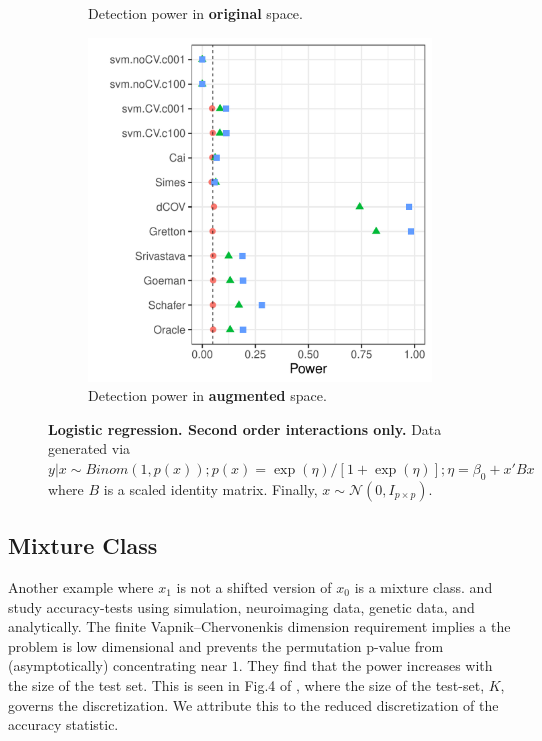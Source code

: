 \documentclass[oupdraft]{bio}
\begin{document}
\begin{figure}[th]
\begin{subfigure}[t]{.3\columnwidth}
	\caption{Detection power in \textbf{original} space.} 
	\label{fig:logistic-interactions-only-original}
	\end{subfigure}
	\begin{subfigure}[t]{.3\columnwidth}
	\centering
	\includegraphics[width=1\columnwidth]{"file43"}
	\caption{Detection power in \textbf{augmented} space.} 
	\label{fig:logistic-interactions-only-augmented}
	\end{subfigure}
	\caption{\textbf{Logistic regression. Second order interactions only.}
		Data generated via $y|x \sim Binom(1,p(x));
		p(x)=\exp(\eta)/[1+\exp(\eta)];
		\eta=\beta_0+x'Bx$ 
		where $B$ is a scaled identity matrix.
		Finally, $x\sim \mathcal{N}(0,I_{p\times p})$.	
	}
	\label{fig:logistic-interactions-only}
\end{figure}







\subsection{Mixture Class}

Another example where $x_1$ is not a shifted version of $x_0$ is a mixture class. 
\cite{golland_permutation_2003} and \cite{golland_permutation_2005} study accuracy-tests using simulation, neuroimaging data, genetic data, and analytically.
The finite Vapnik–Chervonenkis dimension requirement \cite[Sec 4.3]{golland_permutation_2005} implies a the problem is low dimensional and prevents the permutation p-value from (asymptotically) concentrating near $1$. 
They find that the power increases with the size of the test set.
This is seen in Fig.4 of \cite{golland_permutation_2005}, where the size of the test-set, $K$, governs the discretization. 
We attribute this to the reduced discretization of the accuracy statistic.
\end{document}
